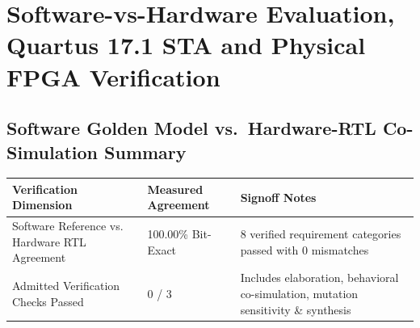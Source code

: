\documentclass[11pt,a4paper]{article}
\begin{document}
\section{Software-vs-Hardware Evaluation, Quartus 17.1 STA and Physical FPGA Verification}

\subsection{Software Golden Model vs.\ Hardware-RTL Co-Simulation Summary}

{\small\renewcommand{\arraystretch}{1.18}\begin{longtable}{@{}L{0.38\textwidth}|L{0.22\textwidth}|L{0.32\textwidth}@{}}\toprule

\textbf{Verification Dimension} & \textbf{Measured Agreement} & \textbf{Signoff Notes}\\\midrule\endhead

Software Reference vs. Hardware RTL Agreement & 100.00\% Bit-Exact & 8 verified requirement categories passed with 0 mismatches\\[2pt]\hline

Admitted Verification Checks Passed & 0 /\allowbreak{} 3 & Includes elaboration,\allowbreak{} behavioral co-simulation,\allowbreak{} mutation sensitivity \& synthesis\\[2pt]\hline

\bottomrule\end{longtable}}
\end{document}
